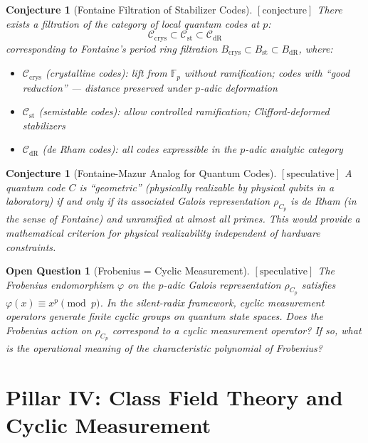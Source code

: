 \documentclass[12pt]{article}
\newtheorem{conjecture}[definition]{Conjecture}
\newtheorem{question}[definition]{Open Question}
\theoremstyle{remark}
\begin{document}
\begin{conjecture}[Fontaine Filtration of Stabilizer Codes]
$[\text{conjecture}]$
There exists a filtration of the category of local quantum codes at $p$:
\[
\mathcal{C}_{\text{crys}} \subset
\mathcal{C}_{\text{st}} \subset
\mathcal{C}_{\text{dR}}
\]
corresponding to Fontaine's period ring filtration
$B_{\text{crys}} \subset B_{\text{st}} \subset B_{\text{dR}}$, where:
\begin{itemize}
\item $\mathcal{C}_{\text{crys}}$ (crystalline codes): lift from $\mathbb{F}_p$
  without ramification; codes with ``good reduction'' — distance preserved
  under $p$-adic deformation
\item $\mathcal{C}_{\text{st}}$ (semistable codes): allow controlled
  ramification; Clifford-deformed stabilizers
\item $\mathcal{C}_{\text{dR}}$ (de Rham codes): all codes expressible
  in the $p$-adic analytic category
\end{itemize}
\end{conjecture}

\begin{conjecture}[Fontaine-Mazur Analog for Quantum Codes]
$[\text{speculative}]$
A quantum code $C$ is ``geometric'' (physically realizable by physical qubits
in a laboratory) if and only if its associated Galois representation
$\rho_{C_p}$ is de Rham (in the sense of Fontaine) and unramified at almost
all primes. This would provide a mathematical criterion for physical
realizability independent of hardware constraints.
\end{conjecture}

\begin{question}[Frobenius = Cyclic Measurement]
$[\text{speculative}]$
The Frobenius endomorphism $\varphi$ on the $p$-adic Galois representation
$\rho_{C_p}$ satisfies $\varphi(x) \equiv x^p \pmod{p}$. In the silent-radix
framework, cyclic measurement operators generate finite cyclic groups on
quantum state spaces. Does the Frobenius action on $\rho_{C_p}$ correspond
to a cyclic measurement operator? If so, what is the operational meaning
of the characteristic polynomial of Frobenius?
\end{question}

\section{Pillar IV: Class Field Theory and Cyclic Measurement}
\end{document}
